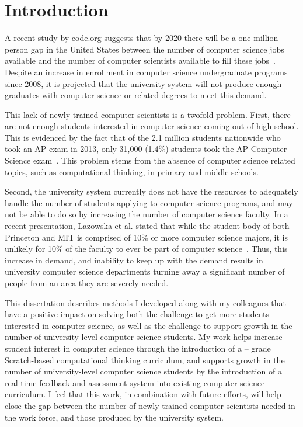 \chapter{Introduction} \label{chap:introduction}
A recent study by code.org suggests that by 2020 there will be a one million
person gap in the United States between the number of computer science jobs
available and the number of computer scientists available to fill these
jobs~\cite{codeorg:2013}. Despite an increase in enrollment in computer science
undergraduate programs since 2008, it is projected that the university system
will not produce enough graduates with computer science or related degrees to
meet this demand.

This lack of newly trained computer scientists is a twofold problem. First,
there are not enough students interested in computer science coming out of high
school. This is evidenced by the fact that of the 2.1 million students
nationwide who took an AP exam in 2013, only 31,000 (1.4\%) students took the
AP Computer Science exam~\cite{cb:2013}. This problem stems from the absence of
computer science related topics, such as computational thinking, in primary and
middle schools.

Second, the university system currently does not have the resources to
adequately handle the number of students applying to computer science programs,
and may not be able to do so by increasing the number of computer science
faculty. In a recent presentation, Lazowska et al. stated that while the
student body of both Princeton and MIT is comprised of 10\% or more computer
science majors, it is unlikely for 10\% of the faculty to ever be part of
computer science~\cite{lazowska:2014}. Thus, this increase in demand, and
inability to keep up with the demand results in university computer science
departments turning away a significant number of people from an area they are
severely needed.

This dissertation describes methods I developed along with my colleagues that
have a positive impact on solving both the challenge to get more students
interested in computer science, as well as the challenge to support growth in
the number of university-level computer science students. My work helps
increase student interest in computer science through the introduction of a
-- grade Scratch-based computational thinking curriculum, and
supports growth in the number of university-level computer science students by
the introduction of a real-time feedback and assessment system into existing
computer science curriculum.  I feel that this work, in combination with future
efforts, will help close the gap between the number of newly trained computer
scientists needed in the work force, and those produced by the university
system.

